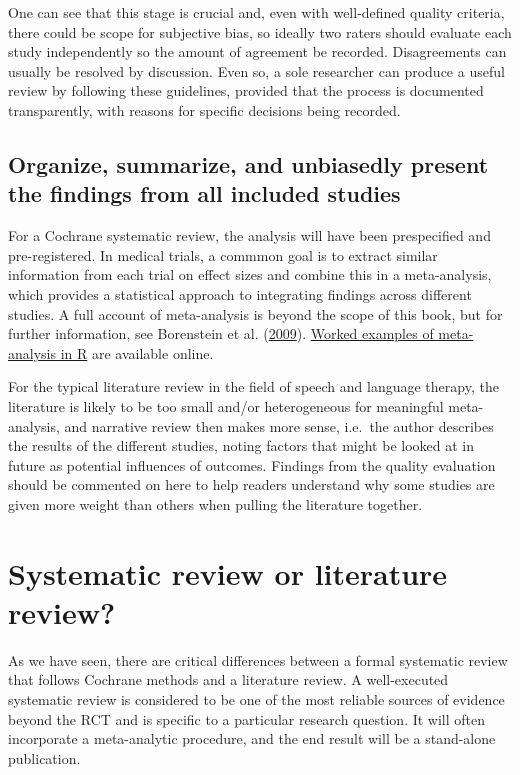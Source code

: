\documentclass{krantz}
\begin{document}
One can see that this stage is crucial and, even with well-defined quality criteria, there could be scope for subjective bias, so ideally two raters should evaluate each study independently so the amount of agreement be recorded. Disagreements can usually be resolved by discussion. Even so, a sole researcher can produce a useful review by following these guidelines, provided that the process is documented transparently, with reasons for specific decisions being recorded.

\hypertarget{organize-summarize-and-unbiasedly-present-the-findings-from-all-included-studies}{%
\subsection{Organize, summarize, and unbiasedly present the findings from all included studies}\label{organize-summarize-and-unbiasedly-present-the-findings-from-all-included-studies}}

For a Cochrane systematic review, the analysis will have been prespecified and pre-registered. In medical trials, a commmon goal is to extract similar information from each trial on effect sizes and combine this in a meta-analysis, which provides a statistical approach to integrating findings across different studies. A full account of meta-analysis is beyond the scope of this book, but for further information, see Borenstein et al. (\protect\hyperlink{ref-borenstein2009}{2009}). \href{https://ebmh.bmj.com/content/22/4/153.abstract}{Worked examples of meta-analysis in R} are available online.

For the typical literature review in the field of speech and language therapy, the literature is likely to be too small and/or heterogeneous for meaningful meta-analysis, and narrative review then makes more sense, i.e.~the author describes the results of the different studies, noting factors that might be looked at in future as potential influences of outcomes. Findings from the quality evaluation should be commented on here to help readers understand why some studies are given more weight than others when pulling the literature together.

\hypertarget{systematic-review-or-literature-review}{%
\section{Systematic review or literature review?}\label{systematic-review-or-literature-review}}

As we have seen, there are critical differences between a formal systematic review that follows Cochrane methods and a literature review. A well-executed systematic review is considered to be one of the most reliable sources of evidence beyond the RCT and is specific to a particular research question. It will often incorporate a meta-analytic procedure, and the end result will be a stand-alone publication.
\end{document}
